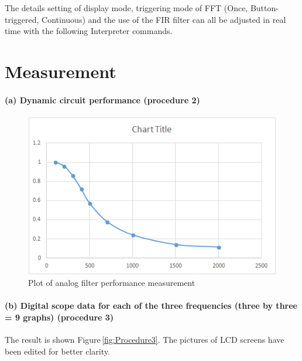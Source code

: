\documentclass[a4paper]{article}
\newlength{\pic}
\begin{document}
The details setting of display mode, triggering mode of FFT (Once, Button-triggered, Continuous) and
the use of the FIR filter can all be adjusted in real time with the following Interpreter commands.

\lstset{language=C, style=MyCStyle}



\section{Measurement}
\paragraph{(a) Dynamic circuit performance (procedure 2)}



\setlength{\pic}{0.8\textwidth}
\begin{figure}[htp]
\center
\includegraphics[width=\pic]{Plots/Procedure2}
\caption{Plot of analog filter performance measurement}
\end{figure}


\paragraph{(b) Digital scope data for each of the three frequencies (three by three = 9 graphs) (procedure 3) \\}
The result is shown Figure\,\ref{fig:Procedure3}. The pictures of LCD screens have been edited for better clarity.

\newlength{\pica}
\newlength{\picb}
\newlength{\picc}


\setlength{\pica}{0.28\textwidth}
\setlength{\picb}{0.4\textwidth}
\setlength{\picc}{0.4\textwidth}
\end{document}
